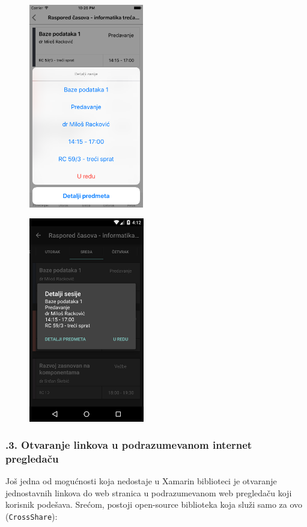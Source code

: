 \documentclass[a4paper]{article}
\begin{document}
\bigskip

\subsubsection[]{\rmfamily }
\begin{figure}
\centering
\includegraphics[width=50.09mm,height=89.09mm]{msc-img70.png}
\end{figure}
\begin{figure}
\centering
\includegraphics[width=50.17mm,height=89.25mm]{msc-img71.png}
\end{figure}
\subsubsection[7.10.3. Otvaranje linkova u podrazumevanom internet
pregledaču]{.3. Otvaranje linkova u podrazumevanom
internet pregledaču}
\hypertarget{RefHeadingToc881882405265}{}Još jedna od mogućnosti koja
nedostaje u Xamarin biblioteci je otvaranje jednostavnih linkova do web
stranica u podrazumevanom web pregledaču koji korisnik podešava.
Srećom, postoji open-source biblioteka koja služi samo za ovo
(\texttt{\textcolor[rgb]{0.0,0.4,0.8}{CrossShare}}):
\end{document}
